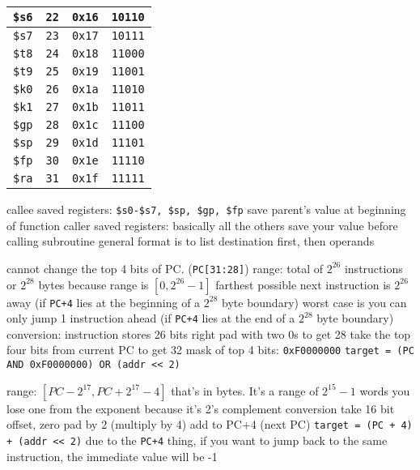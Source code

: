 \documentclass[12pt]{article}
\begin{document}
\begin{spacing}{0.8}
\begin{multicols*}{2}
\begin{flushleft}
\begin{outline}[longenum]
\begin{tabular}{|l r l l|}
  \verb|$s6| & \verb|22| & \verb|0x16| & \verb|10110| \\ \hline
  \verb|$s7| & \verb|23| & \verb|0x17| & \verb|10111| \\ \hline \hline
  \verb|$t8| & \verb|24| & \verb|0x18| & \verb|11000| \\ \hline
  \verb|$t9| & \verb|25| & \verb|0x19| & \verb|11001| \\ \hline \hline
  \verb|$k0| & \verb|26| & \verb|0x1a| & \verb|11010| \\ \hline
  \verb|$k1| & \verb|27| & \verb|0x1b| & \verb|11011| \\ \hline
  \verb|$gp| & \verb|28| & \verb|0x1c| & \verb|11100| \\ \hline
  \verb|$sp| & \verb|29| & \verb|0x1d| & \verb|11101| \\ \hline
  \verb|$fp| & \verb|30| & \verb|0x1e| & \verb|11110| \\ \hline
  \verb|$ra| & \verb|31| & \verb|0x1f| & \verb|11111| \\ \hline
  \end{tabular}
  \1 callee saved registers: \verb|$s0-$s7, $sp, $gp, $fp|
    \2 save parent's value at beginning of function
  \1 caller saved registers: basically all the others
    \2 save your value before calling subroutine
  \1 general format is to list destination first, then operands

  \1 cannot change the top 4 bits of PC. (\verb|PC[31:28]|)
  \1 range:
    \2 total of $2^{26}$ instructions or $2^{28}$ bytes
      \3 because range is $[0,2^{26}-1]$
    \2 farthest possible next instruction is $2^{26}$ away (if \verb|PC+4| lies at the beginning of a $2^{28}$ byte boundary)
    \2 worst case is you can only jump 1 instruction ahead (if \verb|PC+4| lies at the end of a $2^{28}$ byte boundary)
  \1 conversion:
    \2 instruction stores 26 bits
    \2 right pad with two 0s to get 28
    \2 take the top four bits from current PC to get 32
  \1 mask of top 4 bits: \verb|0xF0000000|
  \1 \verb|target = (PC AND 0xF0000000) OR (addr << 2)|

  \1 range: $[ PC - 2^{17}, PC + 2^{17} - 4 ]$
    \2 that's in bytes. It's a range of $2^{15}-1$ words
    \2 you lose one from the exponent because it's 2's complement
  \1 conversion
    \2 take 16 bit offset, zero pad by 2 (multiply by 4)
    \2 add to PC+4 (next PC)
  \1 \verb|target = (PC + 4) + (addr << 2)|
  \1 due to the \verb|PC+4| thing, if you want to jump back to the same instruction, the immediate value will be -1


\end{outline}
\end{flushleft}
\end{multicols*}
\end{spacing}
\end{document}
